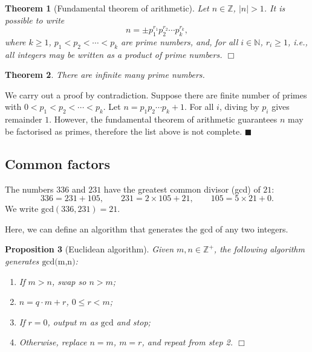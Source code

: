 \documentclass[letter-paper]{tufte-book}
\newtheorem{theorem}{\color{pastel-blue}Theorem}[section]
\newtheorem{proposition}[theorem]{\color{pastel-blue}Proposition}
\newenvironment{proof}[1][Proof]{\begin{trivlist}
\item[\hskip \labelsep {\bfseries #1}]}{\end{trivlist}}
\newenvironment{example}[1][Example]{\begin{trivlist}
\item[\hskip \labelsep {\bfseries #1}]}{\end{trivlist}}
\newcommand{\qed}{\hfill$\blacksquare$}
\newcommand{\qedwhite}{\hfill \ensuremath{\Box}}
\begin{document}
\begin{theorem}[Fundamental theorem of arithmetic]
	Let $n\in\mathbb{Z}$, $|n|>1$. It is possible to write
	\begin{equation*}
	  n=\pm p_1^{r_1}p_2^{r_2}\cdots p_k^{r_k},
	\end{equation*}
	where $k\geq1$, $p_1<p_2<\cdots<p_k$ are prime numbers, and, for all
	$i\in\mathbb{N}$, $r_i\geq1$, i.e., all integers may be written as a product
	of prime numbers. \qedwhite
\end{theorem}
\begin{theorem}
  There are infinite many prime numbers.
\end{theorem}
\begin{proof}
  We carry out a proof by contradiction. Suppose there are finite number of
  primes with $0 < p_1 < p_2 < \cdots < p_k$. Let $n=p_1 p_2 \cdots p_k+1$. For
  all $i$, diving by $p_i$ gives remainder $1$. However, the fundamental theorem
  of arithmetic guarantees $n$ may be factorised as primes, therefore the list
  above is not complete. \qed
\end{proof}


\subsection{Common factors}

\begin{example}
  The numbers $336$ and $231$ have the greatest common divisor (gcd) of $21$:
  \begin{equation*}
    336 = 231+105,\qquad 231 = 2\times105+21,\qquad 105=5\times21+0.
  \end{equation*}
  We write $\mbox{gcd}(336,231)=21$.
\end{example}
Here, we can define an algorithm that generates the $\mbox{gcd}$ of any two
integers.
\begin{proposition}[Euclidean algorithm]
  Given $m,n\in\mathbb{Z}^+$, the following algorithm generates
  $\mbox{gcd(m,n)}$:
  \begin{enumerate}
    \item If $m>n$, swap so $n>m$;
    \item $n=q\cdot m+r$, $0\leq r<m$;
    \item If $r=0$, output $m$ as $\mbox{gcd}$ and stop;
    \item Otherwise, replace $n=m$, $m=r$, and repeat from step 2. \qedwhite
  \end{enumerate}
\end{proposition}
\end{document}
